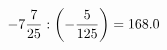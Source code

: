 \documentclass[preview]{standalone}
\begin{document}
\begin{align*}
-7 { 7 \over 25 }  :  \left( - { 5 \over 125 } \right) = 168.0
\end{align*}
\end{document}
